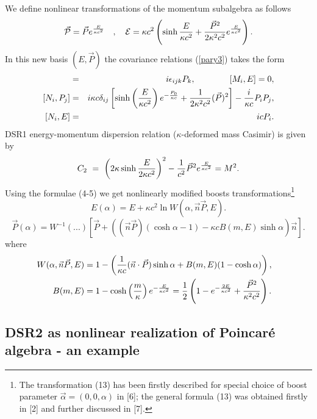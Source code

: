 \documentclass[a4paper,12pt]{article} \usepackage{times}
\begin{document}
We define nonlinear transformations of the momentum subalgebra 
as
follows
\begin{equation}
\vec{\cal{P}}  =  \vec{P} e^\frac{E}{\kappa c^2}\quad,\quad
{\cal{E}} =  \kappa c^2 \left(\sinh\frac{E}{\kappa c^2} +
\frac{\vec{P}^2}{2 \kappa^2 c^2}e^\frac{E}{\kappa c^2}\right) .
\end{equation}
In this new basis $(E, \vec{P})$ the covariance relations (\ref{pary3})
takes the form \begin{eqnarray} [M_i, P_j]& =  & i\epsilon_{ijk} P_k
,\qquad \qquad [M_i,E] =0 ,\cr [N_i,P_j]& =  & i \kappa c
\delta_{ij}\left[\sinh\left(\frac {E}{\kappa c^2}\right)
e^{-\frac{P_0}{\kappa c}}  + \frac1{2\kappa^2 c^2} (\vec P)^2\right] -
\frac {i}{\kappa c} P_i P_j , \cr [N_i, E ] & = &  i c P_i .
\end{eqnarray} DSR1 energy-momentum
 dispersion relation ($\kappa$-deformed mass Casimir) is given
by
\begin{equation}
C_2 \ = \ \left(2\kappa\sinh \frac{E}{2\kappa c^2} \right)^2 -
{1\over c^2}\vec P^2 e^{\frac{E}{\kappa c^2}}  = M^2 .
\end{equation}
Using the formulae (4-5) we get nonlinearly modified  boosts
transformations\footnote{The transformation (13) has been firstly
described for special choice of boost parameter $\vec{\alpha} =
(0,0,\alpha)$ in [6]; the general formula (13) was obtained
firstly in [2] and further discussed in [7]. }
\begin{equation}
E(\alpha)  =   E + \kappa c^2\ln W(\alpha, \vec{n}\vec{P}, E) .
\end{equation}
\begin{equation}
\vec{P}(\alpha) =  W^{-1}(...)\left[\vec{P} +
\left((\vec{n}\vec{P}) (\cosh\alpha - 1) - \kappa c B(m,E)
\sinh\alpha\right) \vec{n}\right] .\end{equation} where
\begin{eqnarray}
W(\alpha, \vec{n}\vec{P}, E) &= 1-\left(\frac{1}{\kappa c}
(\vec{n}\cdot\vec{P})\sinh\alpha + B(m,E) (1-\cosh\alpha)\right)
,\cr B(m,E) & =  1 - \cosh\left(\frac{m}{\kappa}\right)
e^{-\frac{E}{\kappa c^2}}
 = \frac{1}{2}\left(1 -
e^{-\frac{2E}{\kappa c^2}} + \frac{\vec{P}^{2}}{\kappa^2
c^2}\right) .
\end{eqnarray}

\subsection{DSR2 as nonlinear realization of Poincar\'{e}
algebra - an example}
\end{document}
